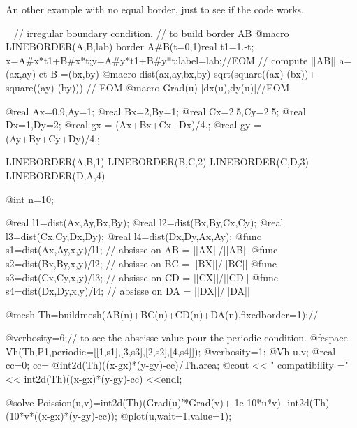 \documentclass[a4paper,twoside,12pt]{book}
\begin{document}
An other example with no equal border, just to see if the code works.
\begin{example}~
\label{exm:periodic4bis}
\bFF
// irregular boundary condition.
//  to build border  AB
@macro  LINEBORDER(A,B,lab) border A#B(t=0,1){real t1=1.-t;
   x=A#x*t1+B#x*t;y=A#y*t1+B#y*t;label=lab;}//EOM
// compute  ||AB||  a=(ax,ay) et B =(bx,by)
@macro dist(ax,ay,bx,by) sqrt(square((ax)-(bx))+ square((ay)-(by)))  // EOM
@macro Grad(u) [dx(u),dy(u)]//EOM


@real Ax=0.9,Ay=1;              @real Bx=2,By=1;
@real Cx=2.5,Cy=2.5;            @real Dx=1,Dy=2;
@real gx = (Ax+Bx+Cx+Dx)/4.;    @real gy = (Ay+By+Cy+Dy)/4.;


LINEBORDER(A,B,1)
LINEBORDER(B,C,2)
LINEBORDER(C,D,3)
LINEBORDER(D,A,4)

@int n=10;

@real l1=dist(Ax,Ay,Bx,By);
@real l2=dist(Bx,By,Cx,Cy);
@real l3=dist(Cx,Cy,Dx,Dy);
@real l4=dist(Dx,Dy,Ax,Ay);
@func s1=dist(Ax,Ay,x,y)/l1;  // absisse on  AB  = ||AX||/||AB||
@func s2=dist(Bx,By,x,y)/l2;  // absisse on  BC  = ||BX||/||BC||
@func s3=dist(Cx,Cy,x,y)/l3;  // absisse on  CD  = ||CX||/||CD||
@func s4=dist(Dx,Dy,x,y)/l4;  // absisse on  DA  = ||DX||/||DA||

@mesh Th=buildmesh(AB(n)+BC(n)+CD(n)+DA(n),fixedborder=1);//

@verbosity=6;// to see the abscisse value pour the periodic condition.
@fespace Vh(Th,P1,periodic=[[1,s1],[3,s3],[2,s2],[4,s4]]);
@verbosity=1;
@Vh u,v;
@real cc=0;
cc= @int2d(Th)((x-gx)*(y-gy)-cc)/Th.area;
@cout << " compatibility =" << int2d(Th)((x-gx)*(y-gy)-cc) <<endl;

@solve Poission(u,v)=int2d(Th)(Grad(u)'*Grad(v)+ 1e-10*u*v)
  -int2d(Th)(10*v*((x-gx)*(y-gy)-cc));
@plot(u,wait=1,value=1);
\eFF
\end{example}
\end{document}
